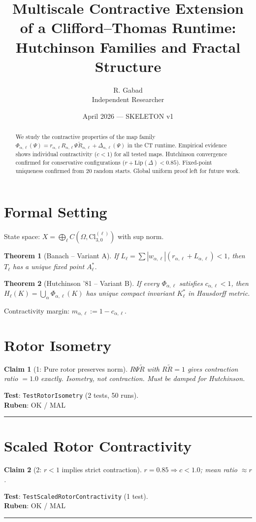 \documentclass[11pt,a4paper]{article}
\title{\textbf{Multiscale Contractive Extension of a Clifford--Thomas Runtime:\\Hutchinson Families and Fractal Structure}}
\author{R. Gabad\\Independent Researcher}
\date{April 2026 --- SKELETON v1}
\newtheorem{claim}{Claim}
\newtheorem{theorem}{Theorem}
\begin{document}
\maketitle

\begin{abstract}
We study the contractive properties of the map family
$\Phi_{\alpha,\ell}(\Psi) = r_{\alpha,\ell} R_{\alpha,\ell} \Psi \tilde{R}_{\alpha,\ell} + \Delta_{\alpha,\ell}(\Psi)$
in the CT runtime. Empirical evidence shows individual contractivity ($c < 1$)
for all tested maps. Hutchinson convergence confirmed for conservative
configurations ($r + \mathrm{Lip}(\Delta) < 0.85$). Fixed-point uniqueness
confirmed from 20 random starts. Global uniform proof left for future work.
\end{abstract}

\section{Formal Setting}
State space: $X = \bigoplus_{\ell} C(\Omega, \mathrm{Cl}_{3,0}^{(\ell)})$ with sup norm.

\begin{theorem}[Banach -- Variant A]
If $L_\ell = \sum |w_{\alpha,\ell}|(r_{\alpha,\ell} + L_{\alpha,\ell}) < 1$,
then $T_\ell$ has a unique fixed point $A^*_\ell$.
\end{theorem}

\begin{theorem}[Hutchinson '81 -- Variant B]
If every $\Phi_{\alpha,\ell}$ satisfies $c_{\alpha,\ell} < 1$, then
$H_\ell(K) = \bigcup_\alpha \Phi_{\alpha,\ell}(K)$ has unique compact
invariant $K^*_\ell$ in Hausdorff metric.
\end{theorem}

Contractivity margin: $m_{\alpha,\ell} := 1 - c_{\alpha,\ell}$.

\section{Rotor Isometry}
\begin{claim}[1: Pure rotor preserves norm]
$R\Psi\tilde{R}$ with $R\tilde{R}=1$ gives contraction ratio $= 1.0$ exactly.
Isometry, not contraction. Must be damped for Hutchinson.
\end{claim}
\noindent\textbf{Test}: \texttt{TestRotorIsometry} (2 tests, 50 runs).\\[4pt]
\textbf{Ruben}: OK / MAL \rule{3cm}{0.4pt}

\section{Scaled Rotor Contractivity}
\begin{claim}[2: $r < 1$ implies strict contraction]
$r = 0.85 \Rightarrow c < 1.0$; mean ratio $\approx r$.
\end{claim}
\noindent\textbf{Test}: \texttt{TestScaledRotorContractivity} (1 test).\\[4pt]
\textbf{Ruben}: OK / MAL \rule{3cm}{0.4pt}
\end{document}
